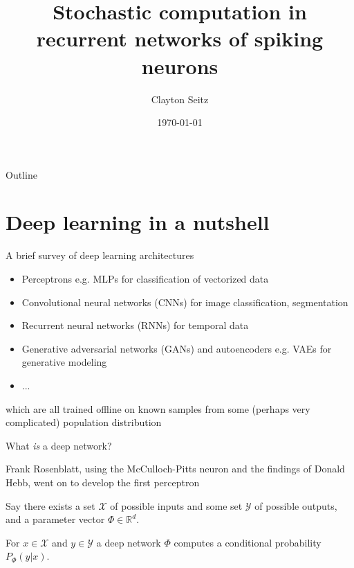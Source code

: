 \documentclass[aspectratio=169]{beamer}
\begin{document}
\title{Stochastic computation in recurrent networks of spiking neurons}  
\author{Clayton Seitz}
\date{\today} 

\maketitle


\begin{frame}{Outline}
\tableofcontents
\end{frame}

\section{Deep learning in a nutshell}

\begin{frame}{A brief survey of deep learning architectures}

\begin{itemize}
\item Perceptrons e.g. MLPs for classification of vectorized data
\item Convolutional neural networks (CNNs) for image classification, segmentation
\item Recurrent neural networks (RNNs) for temporal data
\item Generative adversarial networks (GANs) and autoencoders e.g. VAEs for generative modeling
\item ...
\end{itemize}

\vfill
{\color{red} which are all trained offline on known samples from some (perhaps very complicated) population distribution}

\end{frame}

\begin{frame}{What \emph{is} a deep network?}

Frank Rosenblatt, using the McCulloch-Pitts neuron and the findings of Donald Hebb, went on to develop the first perceptron
\vfill

Say there exists a set $\mathcal X$ of possible inputs and some set $\mathcal Y$ of possible outputs,
and a parameter vector $\Phi \in \mathbb{R}^d$.

\vfill
For $x \in \mathcal X$ and $y \in \mathcal Y$ a deep network $\Phi$ computes a conditional probability {\color{red} $P_\Phi(y|x)$}.
\end{frame}
\end{document}
